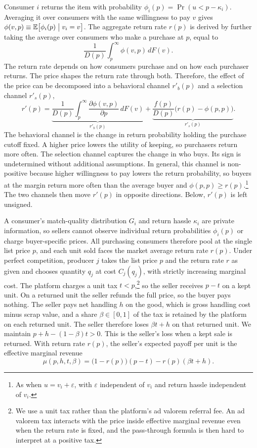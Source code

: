 \documentclass[11pt]{article}
\begin{document}
Consumer $i$ returns the item with probability
$\phi_i(p)=\Pr(u<p-\kappa_i)$.
Averaging it over consumers with the same willingness to pay $v$ gives
$\phi(v,p)\equiv\mathbb{E}\bigl[\phi_i(p)\bigm|v_i=v\bigr]$.
The aggregate return rate $r(p)$ is derived by further taking the
average over consumers who make a purchase at $p$, equal to
\[
  \frac{1}{D(p)}\int_p^\infty \phi(v,p)\,dF(v).
\]
The return rate depends on how consumers purchase and on how each
purchaser returns. The price shapes the return rate through both.
Therefore, the effect of the price can be decomposed into a behavioral
channel $r'_b(p)$ and a selection channel $r'_s(p)$,
\begin{equation}
  r'(p)
  =
  \underbrace{
    \frac{1}{D(p)}\int_p^\infty \frac{\partial \phi(v,p)}{\partial p}\,dF(v)
  }_{r'_b(p)}
  +
  \underbrace{
    \frac{f(p)}{D(p)}\bigl(r(p)-\phi(p,p)\bigr)
  }_{r'_s(p)}.
  \label{eq:r-prime-decomp}
\end{equation}
The behavioral channel is the change in return probability holding the
purchase cutoff fixed. A higher price lowers the utility of keeping, so
purchasers return more often. The selection channel captures the change in
who buys. Its sign is undetermined without additional assumptions. In
general, this channel is non-positive because higher willingness to pay
lowers the return probability, so buyers at the margin return more often
than the average buyer and $\phi(p,p)\geq r(p)$.\footnote{As when
$u=v_i+\varepsilon$, with $\varepsilon$ independent of $v_i$ and return
hassle independent of $v_i$.} The two channels then move $r'(p)$ in opposite
directions. Below, $r'(p)$ is left unsigned.

A consumer's match-quality distribution $G_i$ and return hassle $\kappa_i$ are
private information, so sellers cannot observe individual return probabilities
$\phi_i(p)$ or charge buyer-specific prices. All purchasing consumers therefore
pool at the single list price $p$, and each unit sold faces the market average
return rate $r(p)$. Under perfect competition, producer $j$ takes the list
price $p$ and the return rate $r$ as given and chooses quantity $q_j$ at cost
$C_j(q_j)$, with strictly increasing marginal cost. The platform charges a unit tax $t<p$,\footnote{We
use a unit tax rather than the platform's ad valorem referral fee. An ad
valorem tax interacts with the price inside effective marginal revenue even
when the return rate is fixed, and the pass-through formula is then hard to
interpret at a positive tax.} so
the seller receives $p-t$ on a kept unit. On a returned unit the seller
refunds the full price, so the buyer pays nothing. The seller pays net
handling $h$ on the good, which is gross handling cost minus scrap value,
and a share $\beta\in[0,1]$ of the tax is retained by the platform on each
returned unit. The seller therefore loses $\beta t+h$ on that returned unit.
We maintain $p+h-(1-\beta)t>0$. This is the seller's loss when a kept sale
is returned. With return rate $r(p)$, the seller's expected payoff per unit is
the effective marginal revenue
\begin{equation}
  \mu(p,h,t,\beta)
  =
  \bigl(1-r(p)\bigr)(p-t) - r(p)(\beta t + h).
  \label{eq:mu}
\end{equation}
\end{document}
